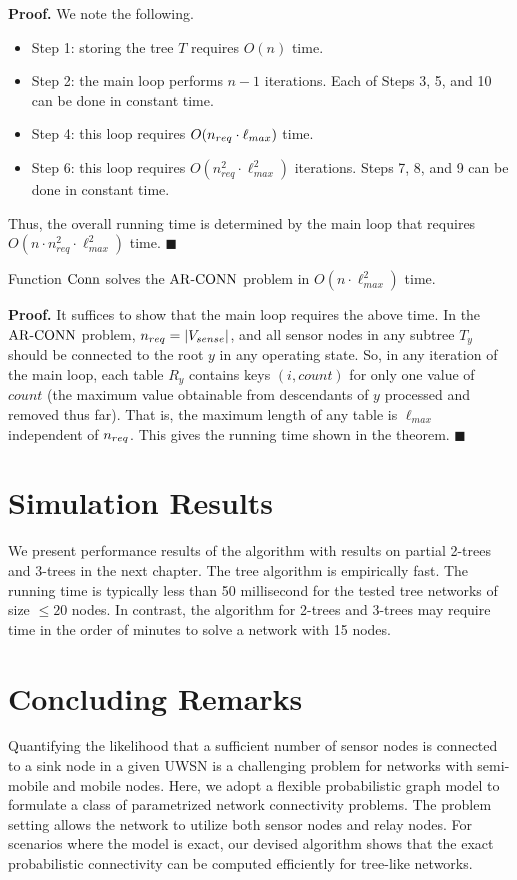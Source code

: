 \nwline
{\bf Proof.}
We note the following.
\begin{itemize}[noitemsep]
\item   Step 1: storing the tree $T$ requires $O(n)$ time.

\item	Step 2: the main loop performs $n-1$ iterations.
	Each of Steps 3, 5, and 10 can be done in constant time.

\item	Step 4: this loop requires $O({n_{req}} \cdot \ell_{max})$ time.

\item	Step 6: this loop requires $O(n_{req}^2 \cdot \ell_{max}^2)$ iterations.
	Steps 7, 8, and 9 can be done in constant time.
\end{itemize}
Thus, the overall running time is determined by the main loop that
requires $O(n \cdot n_{req}^2  \cdot \ell_{max}^2)$ time.
$\blacksquare$
%
\nwline
\begin{theorem}
\normalfont
    Function ${\mathrm {Conn}}$ solves the ${\mathrm {AR\mbox{-}CONN}}$ problem in
    $O(n \cdot \ell_{max}^2)$ time.

\end{theorem}

\nwline
{\bf Proof.}
It suffices to show that the main loop requires the above time.
%
In the ${\mathrm {AR\mbox{-}CONN}}$ problem, ${n_{req}}= |V_{sense}|$, and all sensor nodes
in any subtree $T_y$ should be connected to the root $y$ in any
operating state.
%
So, in any iteration of the main loop, each table $R_y$ contains keys
$(i,count)$ for only one value of $count$ (the maximum value obtainable
from descendants of $y$ processed and removed thus far).
%
That is, the maximum length of any table is $\ell_{max}$ independent
of ${n_{req}}$.
%
This gives the running time shown in the theorem. 
$\blacksquare$
\section{Simulation Results}
We present performance results of the algorithm with results on partial 2-trees and 3-trees in the next chapter. The tree algorithm is empirically fast. The running time is typically
less than 50 millisecond for the tested tree networks of size $\leq 20$ nodes.
In contrast, the algorithm for 2-trees and 3-trees may require time in the order of minutes to solve
a network with 15 nodes.
\section{Concluding Remarks}
Quantifying the likelihood that a sufficient number of sensor nodes is connected to a sink node in a given UWSN is
a challenging problem for networks with semi-mobile and mobile nodes. Here, we adopt a flexible probabilistic
graph model to formulate a class of parametrized network connectivity problems. The problem setting allows the network
to utilize both sensor nodes and relay nodes. For scenarios where the model is exact, our devised algorithm shows that the exact probabilistic connectivity can be computed efficiently for tree-like networks.
